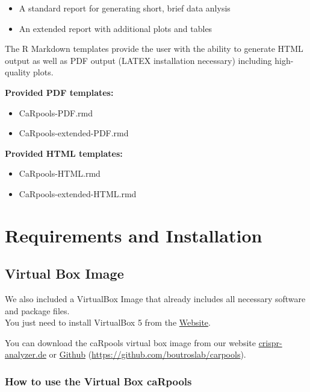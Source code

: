 \documentclass[]{article}
\providecommand{\tightlist}{%
  \setlength{\itemsep}{0pt}\setlength{\parskip}{0pt}}
\begin{document}
\begin{itemize}
\tightlist
\item
  A standard report for generating short, brief data anlysis
\item
  An extended report with additional plots and tables
\end{itemize}

The R Markdown templates provide the user with the ability to generate
HTML output as well as PDF output (LATEX installation necessary)
including high-quality plots.

\textbf{Provided PDF templates:}

\begin{itemize}
\tightlist
\item
  CaRpools-PDF.rmd
\item
  CaRpools-extended-PDF.rmd
\end{itemize}

\textbf{Provided HTML templates:}

\begin{itemize}
\tightlist
\item
  CaRpools-HTML.rmd
\item
  CaRpools-extended-HTML.rmd
\end{itemize}

\newpage

\section{Requirements and
Installation}\label{requirements-and-installation}

\subsection{Virtual Box Image}\label{virtual-box-image}

We also included a VirtualBox Image that already includes all necessary
software and package files.\\
You just need to install VirtualBox 5 from the
\href{https://www.virtualbox.org}{Website}.

You can download the caRpools virtual box image from our website
\href{http://www.crispr-analyzer.de}{crispr-analyzer.de} or
\href{https://github.com/boutroslab/carpools}{Github}
(\url{https://github.com/boutroslab/carpools}).

\subsubsection{How to use the Virtual Box
caRpools}\label{how-to-use-the-virtual-box-carpools}
\end{document}

